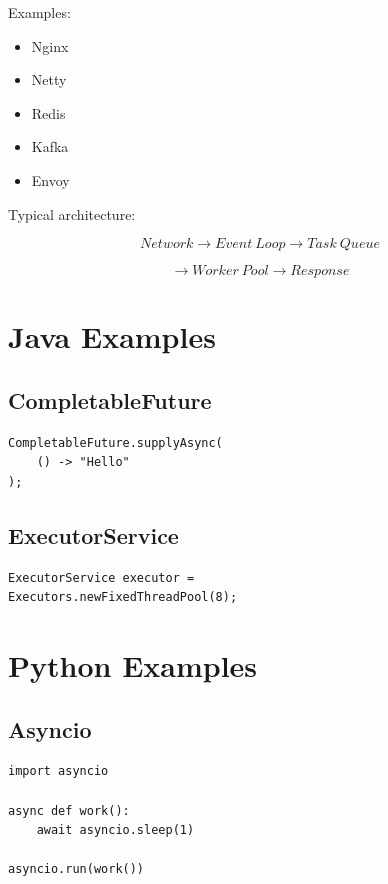 Examples:

\begin{itemize}
\item Nginx
\item Netty
\item Redis
\item Kafka
\item Envoy
\end{itemize}

Typical architecture:

\[
Network \rightarrow Event\ Loop \rightarrow Task\ Queue
\]

\[
\rightarrow Worker\ Pool \rightarrow Response
\]

\section{Java Examples}

\subsection{CompletableFuture}

\begin{verbatim}
CompletableFuture.supplyAsync(
    () -> "Hello"
);
\end{verbatim}

\subsection{ExecutorService}

\begin{verbatim}
ExecutorService executor =
Executors.newFixedThreadPool(8);
\end{verbatim}

\section{Python Examples}

\subsection{Asyncio}

\begin{verbatim}
import asyncio

async def work():
    await asyncio.sleep(1)

asyncio.run(work())
\end{verbatim}

